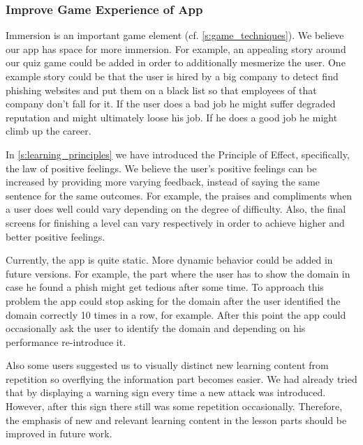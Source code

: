 \subsubsection{Improve Game Experience of App}
\begin{description}[leftmargin=0cm]
	\item[Increase Immersion:] Immersion is an important game element (cf. \autoref{s:game_techniques}).
	We believe our app has space for more immersion. 
	For example, an appealing story around our quiz game could be added in order to additionally mesmerize the user. One example story could be that the user is hired by a big company to detect find phishing websites and put them on a black list so that employees of that company don't fall for it. If the user does a bad job he might suffer degraded reputation and might ultimately loose his job. If he does a good job he might climb up the career.
	\item[Increase Effect:] In \autoref{s:learning_principles} we have introduced the Principle of Effect, specifically, the law of positive feelings. 
	We believe the user's positive feelings can be increased by providing more varying feedback, instead of saying the same sentence for the same outcomes.
	For example, the praises and compliments when a user does well could vary depending on the degree of difficulty.
	Also, the final screens for finishing a level can vary respectively in order to achieve higher and better positive feelings.
	\item[Performance Dependent App Behavior:] Currently, the app is quite static.
More dynamic behavior could be added in future versions.
For example, the part where the user has to show the domain in case he found a phish might get tedious after some time.
To approach this problem the app could stop asking for the domain after the user identified the domain correctly 10 times in a row, for example.
After this point the app could occasionally ask the user to identify the domain and depending on his performance re-introduce it. 
\item[Text Highlighting]
Also some users suggested us to visually distinct new learning content from repetition so overflying the information part becomes easier. 
We had already tried that by displaying a warning sign every time a new attack was introduced.
However, after this sign there still was some repetition occasionally.
Therefore, the emphasis of new and relevant learning content in the lesson parts should be improved in future work.
\end{description}



